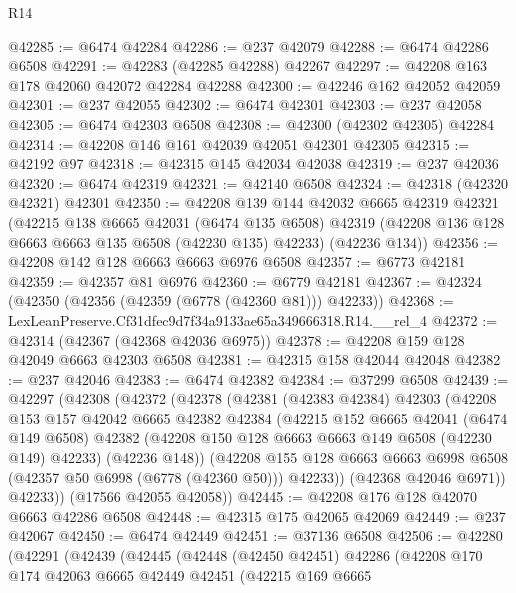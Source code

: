 \begin{lexlean}{R14}
\begin{coremodule}
@42285 := @6474 @42284
@42286 := @237 @42079
@42288 := @6474 @42286 @6508
@42291 := @42283 (@42285 @42288) @42267
@42297 := @42208 @163 @178 @42060 @42072 @42284 @42288
@42300 := @42246 @162 @42052 @42059
@42301 := @237 @42055
@42302 := @6474 @42301
@42303 := @237 @42058
@42305 := @6474 @42303 @6508
@42308 := @42300 (@42302 @42305) @42284
@42314 := @42208 @146 @161 @42039 @42051 @42301 @42305
@42315 := @42192 @97
@42318 := @42315 @145 @42034 @42038
@42319 := @237 @42036
@42320 := @6474 @42319
@42321 := @42140 @6508
@42324 := @42318 (@42320 @42321) @42301
@42350 := @42208
    @139
    @144
    @42032
    @6665
    @42319
    @42321
    (@42215
      @138
      @6665
      @42031
      (@6474 @135 @6508)
      @42319
      (@42208 @136 @128 @6663 @6663 @135 @6508 (@42230 @135) @42233)
      (@42236 @134))
@42356 := @42208 @142 @128 @6663 @6663 @6976 @6508
@42357 := @6773 @42181
@42359 := @42357 @81 @6976
@42360 := @6779 @42181
@42367 := @42324 (@42350 (@42356 (@42359 (@6778 (@42360 @81))) @42233))
@42368 := LexLeanPreserve.Cf31dfec9d7f34a9133ae65a349666318.R14.__rel_4
@42372 := @42314 (@42367 (@42368 @42036 @6975))
@42378 := @42208 @159 @128 @42049 @6663 @42303 @6508
@42381 := @42315 @158 @42044 @42048
@42382 := @237 @42046
@42383 := @6474 @42382
@42384 := @37299 @6508
@42439 := @42297
    (@42308
      (@42372
        (@42378
          (@42381
            (@42383 @42384)
            @42303
            (@42208
              @153
              @157
              @42042
              @6665
              @42382
              @42384
              (@42215
                @152
                @6665
                @42041
                (@6474 @149 @6508)
                @42382
                (@42208 @150 @128 @6663 @6663 @149 @6508 (@42230 @149) @42233)
                (@42236 @148))
              (@42208
                @155
                @128
                @6663
                @6663
                @6998
                @6508
                (@42357 @50 @6998 (@6778 (@42360 @50)))
                @42233))
            (@42368 @42046 @6971))
          @42233))
      (@17566 @42055 @42058))
@42445 := @42208 @176 @128 @42070 @6663 @42286 @6508
@42448 := @42315 @175 @42065 @42069
@42449 := @237 @42067
@42450 := @6474 @42449
@42451 := @37136 @6508
@42506 := @42280
    (@42291
      (@42439
        (@42445
          (@42448
            (@42450 @42451)
            @42286
            (@42208
              @170
              @174
              @42063
              @6665
              @42449
              @42451
              (@42215
                @169
                @6665

\end{coremodule}
\end{lexlean}
